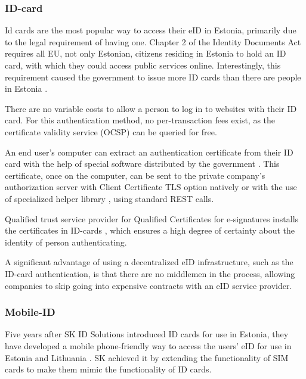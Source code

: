 \subsubsection{ID-card}

Id cards are the most popular way to access their eID in Estonia, primarily due to the legal requirement of having one. Chapter 2 of the Identity Documents Act \cite{eelaw-idcard} requires all EU, not only Estonian, citizens residing in Estonia to hold an ID card, with which they could access public services online. Interestingly, this requirement caused the government to issue more ID cards than there are people in Estonia \cite{ria-idee,statee-population}.

There are no variable costs to allow a person to log in to websites with their ID card. For this authentication method, no per-transaction fees exist, as the certificate validity service (OCSP) \cite{rfc6960} can be queried for free.

An end user's computer can extract an authentication certificate from their ID card with the help of special software distributed by the government \cite{ria-idee}. This certificate, once on the computer, can be sent to the private company's authorization server with Client Certificate TLS option \cite{rfc8446} natively or with the use of specialized helper library \cite{ria-webeid}, using standard REST calls.

Qualified trust service provider for Qualified Certificates for e-signatures  installs the certificates in ID-cards \cite{eu-trustservices}, which ensures a high degree of certainty about the identity of person authenticating.

A significant advantage of using a decentralized eID infrastructure, such as the ID-card authentication, is that there are no middlemen in the process, allowing companies to skip going into expensive contracts with an eID service provider.

\subsubsection{Mobile-ID}

Five years after SK ID Solutions introduced ID cards for use in Estonia, they have developed a mobile phone-friendly way to access the users' eID for use in Estonia and Lithuania \cite{sk-history2007}. SK achieved it by extending the functionality of SIM cards to make them mimic the functionality of ID cards.

